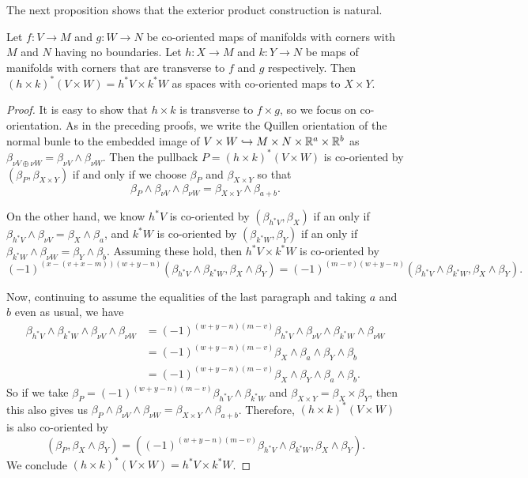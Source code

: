 The next proposition shows that the exterior product construction is natural.

\begin{proposition}\label{P: natural exterior}
	Let $f \colon V \to M$ and $g \colon W \to N$ be co-oriented maps of manifolds with corners with $M$ and $N$ having no boundaries.
	Let $h \colon X \to M$ and $k \colon Y \to N$ be maps of manifolds with corners that are transverse to $f$ and $g$ respectively.
	Then $(h \times k)^*(V \times W) = h^*V \times k^*W$ as spaces with co-oriented maps to $X \times Y$.
\end{proposition}

\begin{proof}
	It is easy to show that $h \times k$ is transverse to $f \times g$, so we focus on co-orientation.
	As in the preceding proofs, we write the Quillen orientation of the normal bunle to the embedded image of $V \times W \hookrightarrow M \times N \times \mathbb{R}^a \times \mathbb{R}^b$ as $\beta_{\nu V \oplus \nu W} = \beta_{\nu V} \wedge \beta_{\nu W}$.
	Then the pullback $P = (h \times k)^*(V \times W)$ is co-oriented by $(\beta_P,\beta_{X \times Y})$ if and only if we choose $\beta_P$ and $\beta_{X \times Y}$ so that
	$$\beta_{P} \wedge \beta_{\nu V} \wedge \beta_{\nu W} = \beta_{X \times Y} \wedge \beta_{a+b}.$$

	On the other hand, we know $h^*V$ is co-oriented by $(\beta_{h^*V},\beta_X)$ if an only if $\beta_{h^*V} \wedge \beta_{\nu V} = \beta_X \wedge \beta_a$, and $k^*W$ is co-oriented by $(\beta_{k^*W},\beta_Y)$ if an only if $\beta_{k^*W} \wedge \beta_{\nu W} = \beta_Y \wedge \beta_b$.
	Assuming these hold, then $h^*V \times k^*W$ is co-oriented by $$(-1)^{(x-(v+x-m))(w+y-n)}(\beta_{h^*V} \wedge \beta_{k^*W},\beta_X \wedge \beta_Y) = (-1)^{(m-v)(w+y-n)}(\beta_{h^*V} \wedge \beta_{k^*W},\beta_X \wedge \beta_Y).$$

	Now, continuing to assume the equalities of the last paragraph and taking $a$ and $b$ even as usual, we have
	\begin{align*}
		\beta_{h^*V} \wedge \beta_{k^*W} \wedge \beta_{\nu V} \wedge \beta_{\nu W}
		& = (-1)^{(w+y-n)(m-v)}\beta_{h^*V} \wedge \beta_{\nu V} \wedge \beta_{k^*W} \wedge \beta_{\nu W}\\
		& = (-1)^{(w+y-n)(m-v)}\beta_X \wedge \beta_a \wedge \beta_Y \wedge \beta_b \\
		& = (-1)^{(w+y-n)(m-v)}\beta_X \wedge \beta_Y \wedge \beta_a \wedge \beta_b.
	\end{align*}
	So if we take $\beta_P = (-1)^{(w+y-n)(m-v)}\beta_{h^*V} \wedge \beta_{k^*W}$ and $\beta_{X \times Y} = \beta_X \times \beta_Y$, then this also gives us $\beta_{P} \wedge \beta_{\nu V} \wedge \beta_{\nu W} = \beta_{X \times Y} \wedge \beta_{a+b}$.
	Therefore,
	$(h \times k)^*(V \times W)$ is also co-oriented by
	$$(\beta_P,\beta_X \wedge \beta_Y) = ((-1)^{(w+y-n)(m-v)}\beta_{h^*V} \wedge \beta_{k^*W},\beta_X \wedge \beta_Y).$$ We conclude $(h \times k)^*(V \times W) = h^*V \times k^*W$.
\end{proof}


